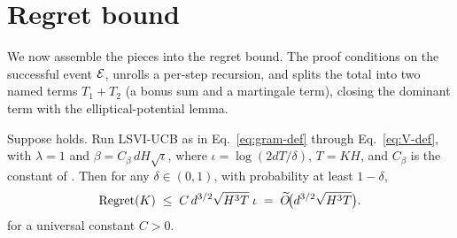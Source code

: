 \section{Regret bound}\label{sec:main}

We now assemble the pieces into the regret bound. The proof conditions on the
successful event $\mathcal{E}$, unrolls a per-step recursion, and splits the total into
two named terms $T_1+T_2$ (a bonus sum and a martingale term), closing the
dominant term with the elliptical-potential lemma.

\begin{theorem}\label{thm:regret}
Suppose  holds. Run LSVI-UCB
as in Eq.~\eqref{eq:gram-def} through Eq.~\eqref{eq:V-def}, with $\lambda=1$ and
$\beta=C_\beta\,dH\sqrt{\iota}$, where $\iota=\log(2dT/\delta)$, $T=KH$, and
$C_\beta$ is the constant of . Then for any
$\delta\in(0,1)$, with probability at least $1-\delta$,
\begin{align}\label{eq:regret-bound}
\mathrm{Regret}(K) \;\le\; C\, d^{3/2} \sqrt{H^3 T}\;\iota
\;=\; \widetilde{O}\!\big( d^{3/2}\sqrt{H^3 T} \big).
\end{align}
for a universal constant $C>0$.
\end{theorem}

